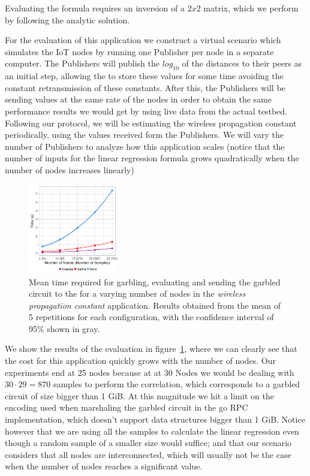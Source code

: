 Evaluating the formula requires an inversion of a $2 x 2$ matrix, which we perform
by following the analytic solution.

For the evaluation of this application we construct a virtual scenario which
simulates the IoT nodes by running one Publisher per node in a separate
computer.  The Publishers will publish the $log_{10}$ of the distances to their
peers as an initial step, allowing the \broker to store these values for some
time avoiding the constant retransmission of these constants.  After this, the
Publishers will be sending values at the same rate of the nodes in order to
obtain the same performance results we would get by using live data from the
actual testbed.  Following our protocol, we will be estimating the wireless
propagation constant periodically, using the values received form the
Publishers.  We will vary the number of Publishers to analyze how this
application scales (notice that the number of inputs for the linear regression
formula grows quadratically when the number of nodes increases linearly)

\begin{figure}
  \includegraphics[width=0.35\textwidth]{plots/turonet.png}
  \caption{Mean time required for garbling, evaluating and sending the garbled
    circuit to the \broker for a varying number of nodes in the \emph{wireless
    propagation constant} application.  Results obtained from the mean of 5
    repetitions for each configuration, with the confidence interval of 95\% shown
    in gray.}
  \label{turonet-times}
\end{figure}

We show the results of the evaluation in figure~\ref{turonet-times}, where we
can clearly see that the cost for this application quickly grows with the
number of nodes.  Our experiments end at 25 nodes because at at 30 Nodes we
would be dealing with $30 \cdot 29 = 870$ samples to perform the correlation,
which corresponds to a garbled circuit of size bigger than 1 GiB.  At this
magnitude we hit a limit on the encoding used when marshaling the garbled
circuit in the go RPC implementation, which doesn't support data structures
bigger than 1 GiB.  Notice however that we are using all the samples to
calculate the linear regression even though a random sample of a smaller size
would suffice; and that our scenario considers that all nodes are
interconnected, which will usually not be the case when the number of nodes
reaches a significant value.


